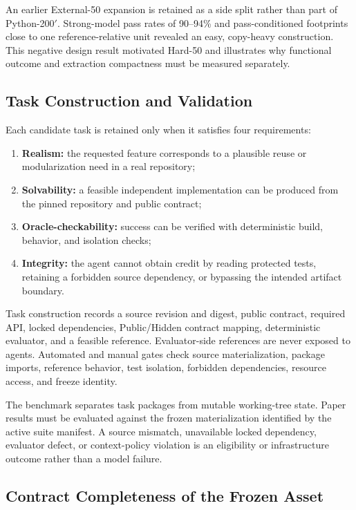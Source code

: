 \documentclass[acmsmall,anonymous,review,screen]{acmart}
\begin{document}
An earlier External-50 expansion is retained as a side split rather than part
of Python-200$'$. Strong-model pass rates of 90--94\% and pass-conditioned
footprints close to one reference-relative unit revealed an easy, copy-heavy
construction. This negative design result motivated Hard-50 and illustrates why
functional outcome and extraction compactness must be measured separately.

\subsection{Task Construction and Validation}

Each candidate task is retained only when it satisfies four requirements:
\begin{enumerate}
  \item \textbf{Realism:} the requested feature corresponds to a plausible
        reuse or modularization need in a real repository;
  \item \textbf{Solvability:} a feasible independent implementation can be
        produced from the pinned repository and public contract;
  \item \textbf{Oracle-checkability:} success can be verified with
        deterministic build, behavior, and isolation checks;
  \item \textbf{Integrity:} the agent cannot obtain credit by reading
        protected tests, retaining a forbidden source dependency, or bypassing
        the intended artifact boundary.
\end{enumerate}

Task construction records a source revision and digest, public contract,
required API, locked dependencies, Public/Hidden contract mapping,
deterministic evaluator, and a feasible reference. Evaluator-side references
are never exposed to agents. Automated and manual gates check source
materialization, package imports, reference behavior, test isolation,
forbidden dependencies, resource access, and freeze identity.

The benchmark separates task packages from mutable working-tree state. Paper
results must be evaluated against the frozen materialization identified by the
active suite manifest. A source mismatch, unavailable locked dependency,
evaluator defect, or context-policy violation is an eligibility or
infrastructure outcome rather than a model failure.

\subsection{Contract Completeness of the Frozen Asset}
\label{sec:standard-subset}
\end{document}
